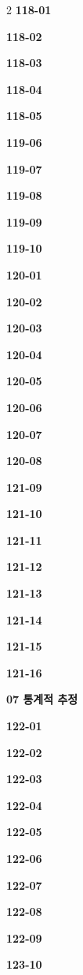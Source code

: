 \documentclass[10pt,a4paper]{article}
\begin{document}
\begin{multicols}{2}
\noindent\textbf{118-01}\ \par
\noindent\textbf{118-02}\ \par
\noindent\textbf{118-03}\ \par
\noindent\textbf{118-04}\ \par
\noindent\textbf{118-05}\ \par
\noindent\textbf{119-06}\ \par
\noindent\textbf{119-07}\ \par
\noindent\textbf{119-08}\ \par
\noindent\textbf{119-09}\ \par
\noindent\textbf{119-10}\ \par
\noindent\textbf{120-01}\ \par
\noindent\textbf{120-02}\ \par
\noindent\textbf{120-03}\ \par
\noindent\textbf{120-04}\ \par
\noindent\textbf{120-05}\ \par
\noindent\textbf{120-06}\ \par
\noindent\textbf{120-07}\ \par
\noindent\textbf{120-08}\ \par
\noindent\textbf{121-09}\ \par
\noindent\textbf{121-10}\ \par
\noindent\textbf{121-11}\ \par
\noindent\textbf{121-12}\ \par
\noindent\textbf{121-13}\ \par
\noindent\textbf{121-14}\ \par
\noindent\textbf{121-15}\ \par
\noindent\textbf{121-16}\ \par
\noindent\textbf{07 통계적 추정}\par\smallskip
\noindent\textbf{122-01}\ \par
\noindent\textbf{122-02}\ \par
\noindent\textbf{122-03}\ \par
\noindent\textbf{122-04}\ \par
\noindent\textbf{122-05}\ \par
\noindent\textbf{122-06}\ \par
\noindent\textbf{122-07}\ \par
\noindent\textbf{122-08}\ \par
\noindent\textbf{122-09}\ \par
\noindent\textbf{123-10}\ \par

\end{multicols}
\end{document}
